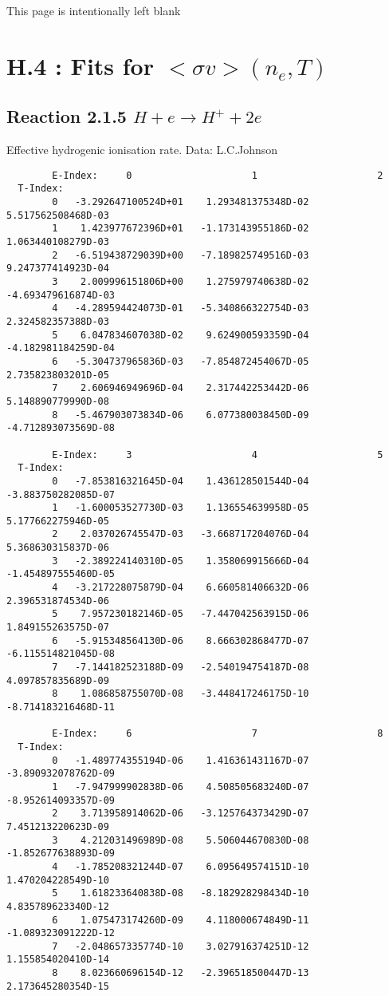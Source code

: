 \documentclass[12pt]{article}
\begin{document}
\newpage
This page is intentionally left blank
\newpage


\section{H.4 :  Fits for $<\sigma v> (n_e,T)$}\label{sect4}

\subsection{
Reaction 2.1.5   $H + e \rightarrow H^+ + 2e $}

   Effective hydrogenic ionisation rate. Data: L.C.Johnson

\begin{small}\begin{verbatim}
        E-Index:     0                     1                     2
  T-Index:
        0   -3.292647100524D+01    1.293481375348D-02    5.517562508468D-03
        1    1.423977672396D+01   -1.173143955186D-02    1.063440108279D-03
        2   -6.519438729039D+00   -7.189825749516D-03    9.247377414923D-04
        3    2.009996151806D+00    1.275979740638D-02   -4.693479616874D-03
        4   -4.289594424073D-01   -5.340866322754D-03    2.324582357388D-03
        5    6.047834607038D-02    9.624900593359D-04   -4.182981184259D-04
        6   -5.304737965836D-03   -7.854872454067D-05    2.735823803201D-05
        7    2.606946949696D-04    2.317442253442D-06    5.148890779990D-08
        8   -5.467903073834D-06    6.077380038450D-09   -4.712893073569D-08

        E-Index:     3                     4                     5
  T-Index:
        0   -7.853816321645D-04    1.436128501544D-04   -3.883750282085D-07
        1   -1.600053527730D-03    1.136554639958D-05    5.177662275946D-05
        2    2.037026745547D-03   -3.668717204076D-04    5.368630315837D-06
        3   -2.389224140310D-05    1.358069915666D-04   -1.454897555460D-05
        4   -3.217228075879D-04    6.660581406632D-06    2.396531874534D-06
        5    7.957230182146D-05   -7.447042563915D-06    1.849155263575D-07
        6   -5.915348564130D-06    8.666302868477D-07   -6.115514821045D-08
        7   -7.144182523188D-09   -2.540194754187D-08    4.097857835689D-09
        8    1.086858755070D-08   -3.448417246175D-10   -8.714183216468D-11

        E-Index:     6                     7                     8
  T-Index:
        0   -1.489774355194D-06    1.416361431167D-07   -3.890932078762D-09
        1   -7.947999902838D-06    4.508505683240D-07   -8.952614093357D-09
        2    3.713958914062D-06   -3.125764373429D-07    7.451213220623D-09
        3    4.212031496989D-08    5.506044670830D-08   -1.852677638893D-09
        4   -1.785208321244D-07    6.095649574151D-10    1.470204228549D-10
        5    1.618233640838D-08   -8.182928298434D-10    4.835789623340D-12
        6    1.075473174260D-09    4.118000674849D-11   -1.089323091222D-12
        7   -2.048657335774D-10    3.027916374251D-12    1.155854020410D-14
        8    8.023660696154D-12   -2.396518500447D-13    2.173645280354D-15


\end{verbatim}
\end{small}
\end{document}
